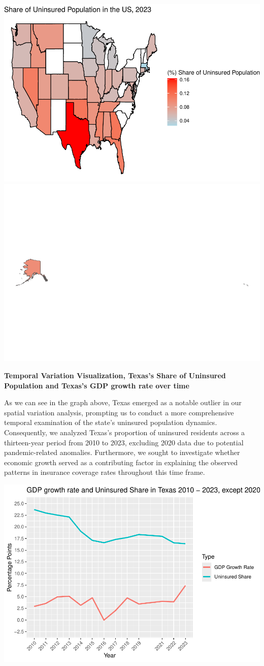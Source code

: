 \documentclass[
]{article}
\begin{document}
\includegraphics[width=0.85\linewidth]{template_files/figure-latex/visualize spatial-1}
\includegraphics[width=0.85\linewidth]{template_files/figure-latex/visualize spatial-2}

\textbf{Temporal Variation Visualization, Texas's Share of Uninsured
Population and Texas's GDP growth rate over time}

As we can see in the graph above, Texas emerged as a notable outlier in
our spatial variation analysis, prompting us to conduct a more
comprehensive temporal examination of the state's uninsured population
dynamics. Consequently, we analyzed Texas's proportion of uninsured
residents across a thirteen-year period from 2010 to 2023, excluding
2020 data due to potential pandemic-related anomalies. Furthermore, we
sought to investigate whether economic growth served as a contributing
factor in explaining the observed patterns in insurance coverage rates
throughout this time frame.

\includegraphics[width=0.8\linewidth]{template_files/figure-latex/visualization temporal-1}
\end{document}
